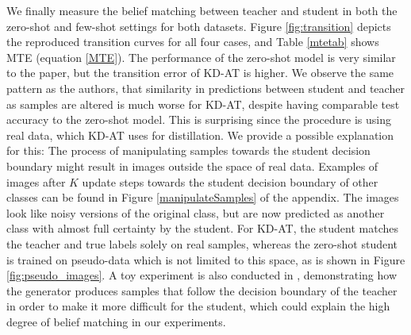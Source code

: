 We finally measure the belief matching between teacher and student in both the zero-shot and few-shot settings for both datasets. Figure \ref{fig:transition} depicts the reproduced transition curves for all four cases, and Table \ref{mtetab} shows MTE (equation \ref{MTE}). The performance of the zero-shot model is very similar to the paper, but the transition error of KD-AT is higher. We observe the same pattern as the authors, that similarity in predictions between student and teacher as samples are altered is much worse for KD-AT, despite having comparable test accuracy to the zero-shot model. This is surprising since the procedure is using real data, which KD-AT uses for distillation. We provide a possible explanation for this: The process of manipulating samples towards the student decision boundary might result in images outside the space of real data. Examples of images after $K$ update steps towards the student decision boundary of other classes can be found in Figure \ref{manipulateSamples} of the appendix. The images look like noisy versions of the original class, but are now predicted as another class with almost full certainty by the student. For KD-AT, the student matches the teacher and true labels solely on real samples, whereas the zero-shot student is trained on pseudo-data which is not limited to this space, as is shown in Figure \ref{fig:pseudo_images}. A toy experiment is also conducted in \cite{Micaelli2019ZeroShotKT}, demonstrating how the generator produces samples that follow the decision boundary of the teacher in order to make it more difficult for the student, which could explain the high degree of belief matching in our experiments.

